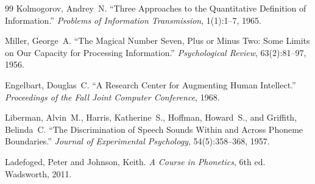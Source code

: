 \documentclass[12pt,a4paper]{article}
\theoremstyle{plain}
\theoremstyle{definition}
\theoremstyle{remark}
\begin{document}
\begin{thebibliography}{99}
Kolmogorov, Andrey~N.
``Three Approaches to the Quantitative Definition of Information.''
\textit{Problems of Information Transmission}, 1(1):1--7, 1965.

Miller, George~A.
``The Magical Number Seven, Plus or Minus Two: Some Limits on Our Capacity
for Processing Information.''
\textit{Psychological Review}, 63(2):81--97, 1956.

Engelbart, Douglas~C.
``A Research Center for Augmenting Human Intellect.''
\textit{Proceedings of the Fall Joint Computer Conference}, 1968.

Liberman, Alvin~M., Harris, Katherine~S., Hoffman, Howard~S., and Griffith,
Belinda~C.
``The Discrimination of Speech Sounds Within and Across Phoneme Boundaries.''
\textit{Journal of Experimental Psychology}, 54(5):358--368, 1957.

Ladefoged, Peter and Johnson, Keith.
\textit{A Course in Phonetics}, 6th ed.
Wadsworth, 2011.

\end{thebibliography}
\end{document}
